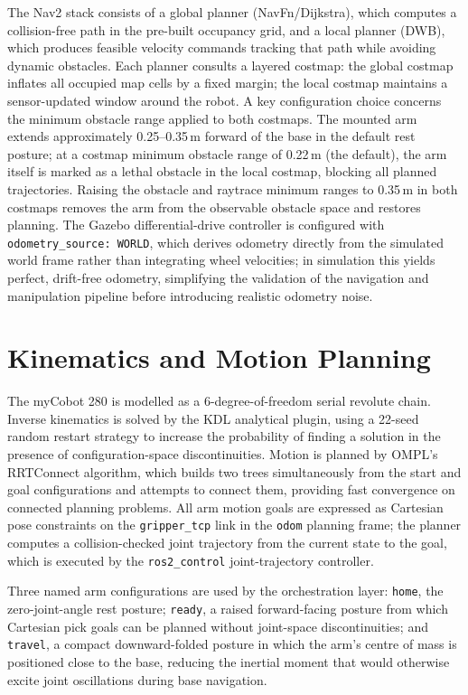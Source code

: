 The Nav2 stack consists of a global planner (NavFn/Dijkstra), which computes a
collision-free path in the pre-built occupancy grid, and a local planner (DWB), which
produces feasible velocity commands tracking that path while avoiding dynamic obstacles.
Each planner consults a layered costmap: the global costmap inflates all occupied map
cells by a fixed margin; the local costmap maintains a sensor-updated window around the
robot. A key configuration choice concerns the minimum obstacle range applied to both
costmaps. The mounted arm extends approximately 0.25--0.35\,m forward of the base in
the default rest posture; at a costmap minimum obstacle range of 0.22\,m (the default),
the arm itself is marked as a lethal obstacle in the local costmap, blocking all planned
trajectories. Raising the obstacle and raytrace minimum ranges to 0.35\,m in both
costmaps removes the arm from the observable obstacle space and restores planning. The
Gazebo differential-drive controller is configured with \texttt{odometry\_source: WORLD},
which derives odometry directly from the simulated world frame rather than integrating
wheel velocities; in simulation this yields perfect, drift-free odometry, simplifying
the validation of the navigation and manipulation pipeline before introducing realistic
odometry noise.

\section{Kinematics and Motion Planning}
The myCobot 280 is modelled as a 6-degree-of-freedom serial revolute chain. Inverse
kinematics is solved by the KDL analytical plugin, using a 22-seed random restart
strategy to increase the probability of finding a solution in the presence of
configuration-space discontinuities. Motion is planned by OMPL's RRTConnect algorithm,
which builds two trees simultaneously from the start and goal configurations and
attempts to connect them, providing fast convergence on connected planning problems.
All arm motion goals are expressed as Cartesian pose constraints on the
\texttt{gripper\_tcp} link in the \texttt{odom} planning frame; the planner computes a
collision-checked joint trajectory from the current state to the goal, which is executed
by the \texttt{ros2\_control} joint-trajectory controller.

Three named arm configurations are used by the orchestration layer: \texttt{home}, the
zero-joint-angle rest posture; \texttt{ready}, a raised forward-facing posture from
which Cartesian pick goals can be planned without joint-space discontinuities; and
\texttt{travel}, a compact downward-folded posture in which the arm's centre of mass
is positioned close to the base, reducing the inertial moment that would otherwise
excite joint oscillations during base navigation.
